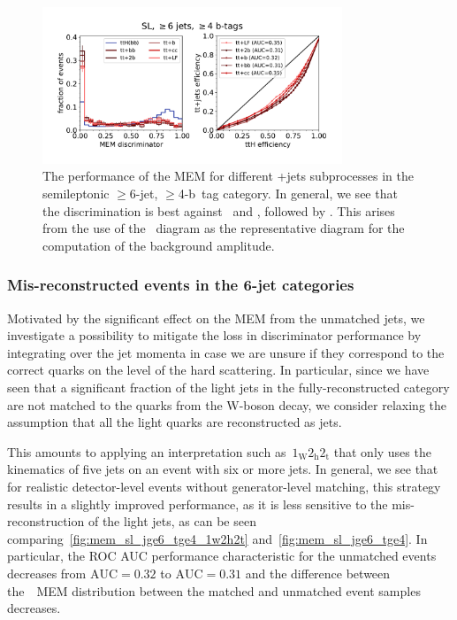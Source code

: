 \begin{figure}[ht]
\begin{centering}
\includegraphics[width = 0.8\textwidth]{figures/mem/mem_sl_jge6_tge4_byttX.pdf}
\caption[Performance of the MEM for different \ttbar+jets subprocesses]{The performance of the MEM for different \ttbar+jets subprocesses in the semileptonic $\geq$6-jet, $\geq$4-b~tag category. In general, we see that the discrimination is best against \ttbb~and \tttwob, followed by \ttb. This arises from the use of the \ttbb~diagram as the representative diagram for the computation of the background amplitude.}
\label{fig:mem_sl_jge6_tge4_byttX}
\end{centering}
\end{figure}

\subsubsection{Mis-reconstructed events in the 6-jet categories}
Motivated by the significant effect on the MEM from the unmatched jets, we investigate a possibility to mitigate the loss in discriminator performance by integrating over the jet momenta in case we are unsure if they correspond to the correct quarks on the level of the hard scattering. In particular, since we have seen that a significant fraction of the light jets in the fully-reconstructed category are not matched to the quarks from the W-boson decay, we consider relaxing the assumption that all the light quarks are reconstructed as jets.

This amounts to applying an interpretation such as~$1_{\mathrm{W}} 2_{\mathrm{h}} 2_{\mathrm{t}}$ that only uses the kinematics of five jets on an event with six or more jets. In general, we see that for realistic detector-level events without generator-level matching, this strategy results in a slightly improved performance, as it is less sensitive to the mis-reconstruction of the light jets, as can be seen comparing~\cref{fig:mem_sl_jge6_tge4_1w2h2t} and~\cref{fig:mem_sl_jge6_tge4}. In particular, the ROC AUC performance characteristic for the unmatched events decreases from $\mathrm{AUC} = 0.32$ to $\mathrm{AUC} = 0.31$ and the difference between the~\ttHbb~MEM distribution between the matched and unmatched event samples decreases.

